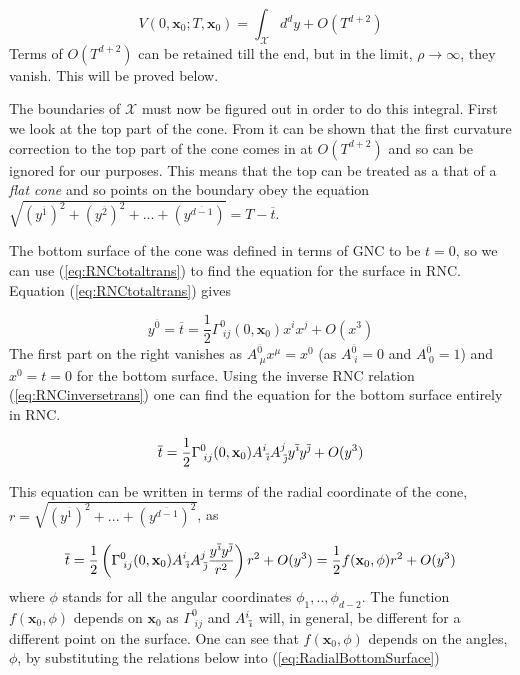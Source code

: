 \documentclass[12pt]{article}
\newcommand{\be}{\begin{equation}}
\newcommand{\ee}{\end{equation}}
\begin{document}
\be\label{eq:VolumeToLowestOrder}
V(0,\mathbf{x}_0;T,\mathbf{x}_0) =\int_{\mathcal{X}}d^dy+O(T^{d+2})
\ee
Terms of $O(T^{d+2})$ can be retained till the end, but in the limit, $\rho\rightarrow\infty$, they vanish. This will be proved below.

The boundaries of $\mathcal{X}$ must now be figured out in order to do this integral. First we look at the top part of the cone. From \cite{Khetrapal_Sumati:Causal_Diamond_Volume} it can be shown that the first curvature correction to the top part of the cone comes in at $O(T^{d+2})$ and so can be ignored for our purposes. This means that the top can be treated as a that of a \textit{flat cone} and so points on the boundary obey the equation $\sqrt{(y^{\overline{1}})^2+(y^{\overline{2}})^2+...+(y^{\overline{d-1}})} = T-\overline{t}$.

The bottom surface of the cone was defined in terms of GNC to be $t=0$, so we can use (\ref{eq:RNCtotaltrans}) to find the equation for the surface in RNC. Equation (\ref{eq:RNCtotaltrans}) gives

\be\label{eq:BottomSurfaceWithGNC}
y^{\overline{0}}=\overline{t}=\frac{1}{2}\Gamma^{0}_{\;ij}(0,\mathbf{x}_0)x^i x^j+O(x^3)
\ee
The first part on the right vanishes as $A^{\overline{0}}_{\;\mu}x^{\mu}=x^0$ (as $A^{\overline{0}}_{\;i}=0$ and $A^{\overline{0}}_{\;0}=1$) and $x^0=t=0$ for the bottom surface. Using the inverse RNC relation (\ref{eq:RNCinversetrans}) one can find the equation for the bottom surface entirely in RNC.

\be\label{eq:BottomSurface}
\overline{t}=\frac{1}{2}\Gamma^{0}_{\;ij}(0,\mathbf{x}_0)A^{i}_{\;\overline{\emph\i}}A^{j}_{\;\overline{\emph\j}}y^{\overline{\emph\i}} y^{\overline{\emph\j}}+O(y^3)
\ee

This equation can be written in terms of the radial coordinate of the cone, $r=\sqrt{(y^{\overline{1}})^2+...+(y^{\overline{d-1}})^2}$, as

\be\label{eq:RadialBottomSurface}
\overline{t}=\frac{1}{2}\left(\Gamma^{0}_{\;ij}(0,\mathbf{x}_0)A^{i}_{\;\overline{\emph\i}}A^{j}_{\;\overline{\emph\j}}\frac{y^{\overline{\emph\i}} y^{\overline{\emph\j}}}{r^2}\right)r^2+O(y^3)=\frac{1}{2}f(\mathbf{x}_0,\phi)r^2+O(y^3)
\ee
where $\phi$ stands for all the angular coordinates $\phi_1,..,\phi_{d-2}$. The function $f(\mathbf{x}_0,\phi)$ depends on $\mathbf{x}_0$ as $\Gamma^{0}_{\;ij}$ and $A^{i}_{\;\overline{\emph\i}}$ will, in general, be different for a different point on the surface. One can see that $f(\mathbf{x}_0,\phi)$ depends on the angles, $\phi$, by substituting the relations below into (\ref{eq:RadialBottomSurface})
\end{document}
